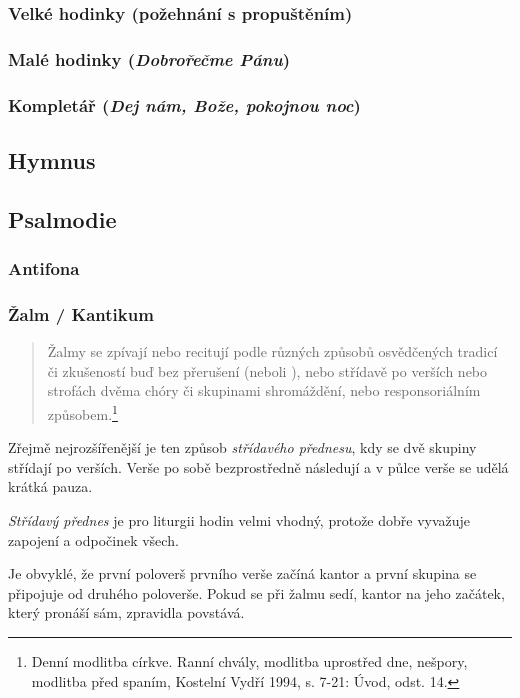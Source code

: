 \subsubsection{Velké hodinky (požehnání s propuštěním)}
\subsubsection{Malé hodinky (\emph{Dobrořečme Pánu})}
\subsubsection{Kompletář (\emph{Dej nám, Bože, pokojnou noc})}

\subsection{Hymnus}
\label{sec:hymnus}

\subsection{Psalmodie}
\label{sec:psalmodie}
\subsubsection{Antifona}
\subsubsection{Žalm / Kantikum}

\begin{quote}
Žalmy se zpívají nebo recitují podle různých způsobů osvědčených tradicí
či zkušeností buď bez přerušení (neboli ),
nebo střídavě po verších nebo strofách dvěma chóry či skupinami
shromáždění, nebo responsoriálním způsobem.\footnote{Denní modlitba církve. Ranní chvály, modlitba uprostřed dne, nešpory, modlitba před spaním, Kostelní Vydří 1994, s. 7-21: Úvod, odst. 14.}
\end{quote}

Zřejmě nejrozšířenější je ten způsob \emph{střídavého přednesu},
kdy se dvě skupiny střídají po verších. Verše po sobě bezprostředně následují a
v půlce verše se udělá krátká pauza.

\emph{Střídavý přednes} je pro liturgii hodin velmi vhodný, protože dobře
vyvažuje zapojení a odpočinek všech.

Je obvyklé, že první poloverš prvního verše začíná kantor a první skupina
se připojuje od druhého poloverše. Pokud se při žalmu sedí, kantor
na jeho začátek, který pronáší sám, zpravidla povstává.


